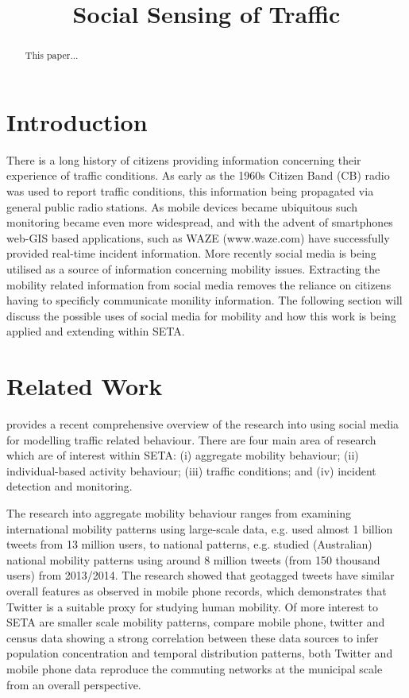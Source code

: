 \documentclass{article}
\begin{document}
\title{Social Sensing of Traffic}

\maketitle

\begin{abstract}

This paper...

\end{abstract}

\section{Introduction}

There is a long history of citizens providing information concerning their experience of traffic conditions. As early as the 1960s Citizen Band (CB) radio was used to report traffic conditions, this information being propagated via general public radio stations. As mobile devices became ubiquitous such monitoring became even more widespread, and with the advent of smartphones web-GIS based applications, such as WAZE (www.waze.com) have successfully provided real-time incident information. More recently social media is being utilised as a source of information concerning mobility issues. Extracting the mobility related information from social media removes the reliance on citizens having to specificly communicate monility information. The following section will discuss the possible uses of social media for mobility and how this work is being applied and extending within SETA.

\section{Related Work}

\cite{rashidi2017exploring} provides a recent comprehensive overview of the research into using social media for modelling traffic related behaviour. There are four main area of research which are of interest within SETA: (i) aggregate mobility behaviour; (ii) individual-based activity behaviour; (iii) traffic conditions; and (iv) incident detection and monitoring.

The research into aggregate mobility behaviour ranges from examining international mobility patterns using large-scale data, e.g. \cite{hawelka2014geo} used almost 1 billion tweets from 13 million users, to national patterns, e.g. \cite{jurdak2015understanding} studied (Australian) national mobility patterns using around 8 million tweets (from 150 thousand users) from 2013/2014. The research showed that geotagged tweets have similar overall features as observed in mobile phone records, which demonstrates that Twitter is a suitable proxy for studying human mobility. Of more interest to SETA are smaller scale mobility patterns, \cite{lenormand2014cross} compare mobile phone, twitter and census data showing a strong correlation between these data sources to infer population concentration and temporal distribution patterns, both Twitter and mobile phone data reproduce the commuting networks at the municipal scale from an overall perspective. 
\end{document}
